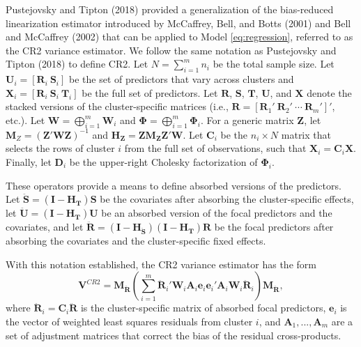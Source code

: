 \documentclass[12pt]{article}
\begin{document}
Pustejovsky and Tipton (2018) provided a generalization of the
bias-reduced linearization estimator introduced by McCaffrey, Bell, and
Botts (2001) and Bell and McCaffrey (2002) that can be applied to Model
\ref{eq:regression}, referred to as the CR2 variance estimator. We
follow the same notation as Pustejovsky and Tipton (2018) to define CR2.
Let \(N = \sum_{i=1}^m n_i\) be the total sample size. Let
\(\mathbf{U}_i = \left[ \mathbf{R}_i \ \mathbf{S}_i \right]\) be the set
of predictors that vary across clusters and
\(\mathbf{X}_i = \left[ \mathbf{R}_i \ \mathbf{S}_i \ \mathbf{T}_i \right]\)
be the full set of predictors. Let \(\mathbf{R}\), \(\mathbf{S}\),
\(\mathbf{T}\), \(\mathbf{U}\), and \(\mathbf{X}\) denote the stacked
versions of the cluster-specific matrices (i.e.,
\(\mathbf{R} = \left[\mathbf{R}_1' \ \mathbf{R}_2' \ \cdots \ \mathbf{R}_m'\right]'\),
etc.). Let \(\mathbf{W} = \bigoplus_{i=1}^m \mathbf{W}_i\) and
\(\boldsymbol\Phi = \bigoplus_{i=1}^m \boldsymbol\Phi_i\). For a generic
matrix \(\mathbf{Z}\), let
\(\mathbf{M}_{Z} = \left(\mathbf{Z}'\mathbf{W}\mathbf{Z}\right)^{-1}\)
and
\(\mathbf{H}_{\mathbf{Z}} = \mathbf{Z} \mathbf{M}_{\mathbf{Z}}\mathbf{Z}'\mathbf{W}\).
Let \(\mathbf{C}_i\) be the \(n_i \times N\) matrix that selects the
rows of cluster \(i\) from the full set of observations, such that
\(\mathbf{X}_i = \mathbf{C}_i \mathbf{X}\). Finally, let
\(\mathbf{D}_i\) be the upper-right Cholesky factorization of
\(\mathbf{\Phi}_i\).

These operators provide a means to define absorbed versions of the
predictors. Let
\(\mathbf{\ddot{S}} = \left(\mathbf{I} - \mathbf{H}_{\mathbf{T}}\right) \mathbf{S}\)
be the covariates after absorbing the cluster-specific effects, let
\(\mathbf{\ddot{U}} = \left(\mathbf{I} - \mathbf{H}_{\mathbf{T}}\right) \mathbf{U}\)
be an absorbed version of the focal predictors and the covariates, and
let
\(\mathbf{\ddot{R}} = \left(\mathbf{I} - \mathbf{H}_{\mathbf{\ddot{S}}}\right)\left(\mathbf{I} - \mathbf{H}_{\mathbf{T}}\right) \mathbf{R}\)
be the focal predictors after absorbing the covariates and the
cluster-specific fixed effects.

With this notation established, the CR2 variance estimator has the form
\begin{equation}
\mathbf{V}^{CR2} = \mathbf{M}_{\mathbf{\ddot{R}}} \left(\sum_{i=1}^m \mathbf{\ddot{R}}_i' \mathbf{W}_i \mathbf{A}_i \mathbf{e}_i \mathbf{e}_i' \mathbf{A}_i \mathbf{W}_i \mathbf{\ddot{R}}_i \right) \mathbf{M}_{\mathbf{\ddot{R}}},
\end{equation} where
\(\mathbf{\ddot{R}}_i = \mathbf{C}_i \mathbf{\ddot{R}}\) is the
cluster-specific matrix of absorbed focal predictors, \(\mathbf{e}_i\)
is the vector of weighted least squares residuals from cluster \(i\),
and \(\mathbf{A}_1,...,\mathbf{A}_m\) are a set of adjustment matrices
that correct the bias of the residual cross-products.
\end{document}
